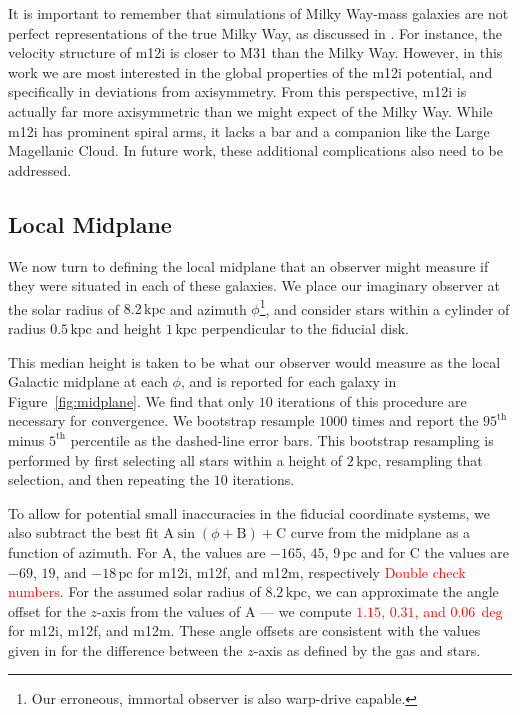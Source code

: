 \documentclass[twocolumn]{aastex62}
\newcommand{\Gus}[1]{\textcolor{red}{#1}}
\newcommand{\pc}{\text{pc}}
\newcommand{\kpc}{\text{kpc}}
\begin{document}
It is important to remember that simulations of Milky Way-mass galaxies are
not perfect representations of the true Milky Way, as discussed in
\citet{2018arXiv180610564S}. For instance, the velocity structure of m12i is
closer to M31 than the Milky Way. However, in this work we are most interested
in the global properties of the m12i potential, and specifically in deviations
from axisymmetry. From this perspective, m12i is actually far more
axisymmetric than we might expect of the Milky Way. While m12i has prominent
spiral arms, it lacks a bar and a companion like the Large Magellanic Cloud.
In future work, these additional complications also need to be addressed.

\subsection{Local Midplane} \label{sec:local_midplane}
We now turn to defining the local midplane that an observer might measure if
they were situated in each of these galaxies. We place our imaginary observer
at the solar radius of $8.2\,\kpc$ and azimuth $\phi$\footnote{Our erroneous,
immortal observer is also warp-drive capable.}, and consider stars within a
cylinder of radius $0.5\,\kpc$ and height $1\,\kpc$ perpendicular to the
fiducial disk.

This median height is taken to be what our observer would measure as the local
Galactic midplane at each $\phi$, and is reported for each galaxy in
Figure~\ref{fig:midplane}. We find that only $10$ iterations of this procedure
are necessary for convergence. We bootstrap resample $1000$ times and report
the $95^{\text{th}}$ minus $5^{\text{th}}$ percentile as the dashed-line error
bars. This bootstrap resampling is performed by first selecting all stars
within a height of $2\,\kpc$, resampling that selection, and then repeating
the $10$ iterations.

To allow for potential small inaccuracies in the fiducial coordinate systems,
we also subtract the best fit $\text{A} \sin{\left(\phi + \text{B}\right)} +
\text{C}$ curve from the midplane as a function of azimuth. For $\text{A}$,
the values are $-165$, $45$, $9\,\pc$ and for $\text{C}$ the values are $-69$,
$19$, and $-18\,\pc$ for m12i, m12f, and m12m, respectively \Gus{Double check
numbers}. For the assumed solar radius of $8.2\,\kpc$, we can approximate the
angle offset for the $z$-axis from the values of $\text{A}$ --- we compute
\Gus{$1.15$, $0.31$, and $0.06\,\deg$} for m12i, m12f, and m12m. These angle
offsets are consistent with the values given in \citet{2018arXiv180610564S}
for the difference between the $z$-axis as defined by the gas and stars.
\end{document}
